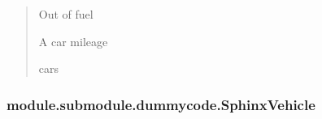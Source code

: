 \documentclass[letterpaper,10pt,english]{sphinxmanual}
\begin{document}
\begin{fulllineitems}
\begin{fulllineitems}
\begin{quote}
\begin{description}
\sphinxAtStartPar
{} \textendash{} Out of fuel

\sphinxAtStartPar
A car mileage

\sphinxAtStartPar
cars

\end{description}\end{quote}

\end{fulllineitems}


\end{fulllineitems}


\sphinxstepscope


\subsubsection{module.submodule.dummycode.SphinxVehicle}
\label{\detokenize{_autosummary/module.submodule.dummycode.SphinxVehicle:module-submodule-dummycode-sphinxvehicle}}\label{\detokenize{_autosummary/module.submodule.dummycode.SphinxVehicle::doc}}
\end{document}
